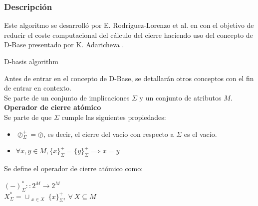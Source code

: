 \subsubsection{Descripci\'on} 


Este algoritmo se desarroll\'o por E. Rodr\'iguez-Lorenzo et al. en \cite{DBasis} con el objetivo  de reducir el coste computacional del c\'alculo del cierre haciendo uso del concepto de D-Base presentado por K. Adaricheva \cite{Adaricheva}.\\

\IncMargin{1em}
\begin{algorithm}[H]
    \SetAlgoLined
    \DontPrintSemicolon
    \caption{D-basis algorithm}\label{alg:7}
\end{algorithm}\DecMargin{1em}
\bigskip

Antes de entrar en el concepto de D-Base, se detallar\'an otros conceptos con el fin de entrar en contexto.\\

Se parte de un conjunto de implicaciones \( \Sigma \) y un conjunto de atributos \( M \).\\

\textbf{Operador de cierre at\'omico}\\
Se parte de que \(\Sigma\) cumple las siguientes propiedades:
\begin{itemize}
    \item \(\oslash^+_{\Sigma} = \oslash\), es decir, el cierre del vac\'io con respecto a \(\Sigma\) es el vac\'io.
    \item \(\forall x,y \in M, \{x\}^+_{\Sigma} = \{y\}^+_{\Sigma} \implies x = y\)
\end{itemize}
Se define el operador de cierre at\'omico como: 
\begin{center}
    \((-)^*_{\Sigma}::2^M \to 2^M \) \\
    \(X^*_{\Sigma} = \cup_{\substack{x \in X}} \{x\}^+_{\Sigma}, \ \forall \ X \subseteq M \)
\end{center}


